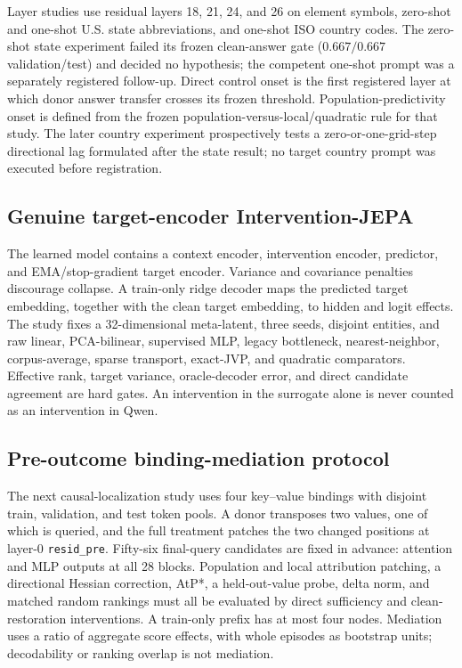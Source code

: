 \documentclass[10pt]{article}
\newcommand{\code}[1]{\texttt{#1}}
\begin{document}
Layer studies use residual layers 18, 21, 24, and 26 on element symbols,
zero-shot and one-shot U.S. state abbreviations, and one-shot ISO country
codes.  The zero-shot state experiment failed its frozen clean-answer gate
($0.667/0.667$ validation/test) and decided no hypothesis; the competent
one-shot prompt was a separately registered follow-up.  Direct
control onset is the first registered layer at which donor answer transfer
crosses its frozen threshold.  Population-predictivity onset is defined from
the frozen population-versus-local/quadratic rule for that study.  The later
country experiment prospectively tests a zero-or-one-grid-step directional
lag formulated after the state result; no target country prompt was executed
before registration.

\subsection{Genuine target-encoder Intervention-JEPA}

The learned model contains a context encoder, intervention encoder, predictor,
and EMA/stop-gradient target encoder.  Variance and covariance penalties
discourage collapse.  A train-only ridge decoder maps the predicted target
embedding, together with the clean target embedding, to hidden and logit
effects.  The study fixes a 32-dimensional meta-latent, three seeds, disjoint
entities, and raw linear, PCA-bilinear, supervised MLP, legacy bottleneck,
nearest-neighbor, corpus-average, sparse transport, exact-JVP, and quadratic
comparators.  Effective rank, target variance, oracle-decoder error, and direct
candidate agreement are hard gates.  An intervention in the surrogate alone
is never counted as an intervention in Qwen.

\subsection{Pre-outcome binding-mediation protocol}

The next causal-localization study uses four key--value bindings with disjoint
train, validation, and test token pools.  A donor transposes two values, one of
which is queried, and the full treatment patches the two changed positions at
layer-0 \code{resid\_pre}.  Fifty-six final-query candidates are fixed in
advance: attention and MLP outputs at all 28 blocks.  Population and local
attribution patching, a directional Hessian correction, AtP*, a held-out-value
probe, delta norm, and matched random rankings must all be evaluated by direct
sufficiency and clean-restoration interventions.  A train-only prefix has at
most four nodes.  Mediation uses a ratio of aggregate score effects, with whole
episodes as bootstrap units; decodability or ranking overlap is not mediation.
\end{document}
